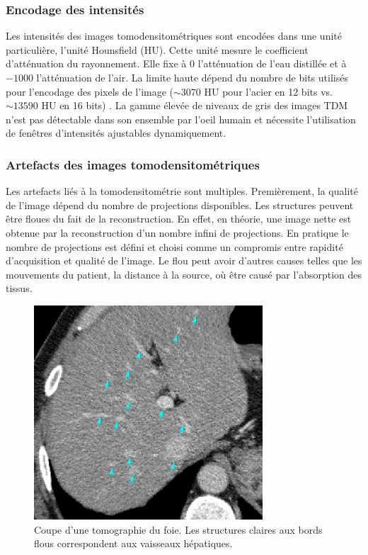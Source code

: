 \subsubsection{Encodage des intensités}
Les intensités des images tomodensitométriques sont encodées dans une unité particulière, l'unité Hounsfield (HU). Cette unité mesure le coefficient d'atténuation du rayonnement. Elle fixe à 0 l'atténuation de l'eau distillée et à $-1000$ l'atténuation de l'air. La limite haute dépend du nombre de bits utilisés pour l'encodage des pixels de l'image ($\sim 3070$ HU pour l'acier en 12 bits vs. $\sim 13590$ HU en 16 bits) \cite{Glide2013_metal_saturation}. La gamme élevée de niveaux de gris des images TDM n'est pas détectable dans son ensemble par l'oeil humain et nécessite l'utilisation de fenêtres d'intensités ajustables dynamiquement.
\subsubsection{Artefacts des images tomodensitométriques}
Les artefacts liés à la tomodensitométrie sont multiples. Premièrement, la qualité de l'image dépend du nombre de projections disponibles. Les structures peuvent être floues du fait de la reconstruction. En effet, en théorie, une image nette est obtenue par la reconstruction d'un nombre infini de projections. En pratique le nombre de projections est défini et choisi comme un compromis entre rapidité d'acquisition et qualité de l'image. Le flou peut avoir d'autres causes telles que les mouvements du patient, la distance à la source, où être causé par l'absorption des tissus. 
\begin{figure}
    \centering
    \includegraphics[height=8cm]{Images/blury_vessels_arrow.png}
    \caption{Coupe d'une tomographie du foie. Les structures claires aux bords flous  correspondent aux vaisseaux hépatiques.}
    \label{fig:CT_blur}
\end{figure}

